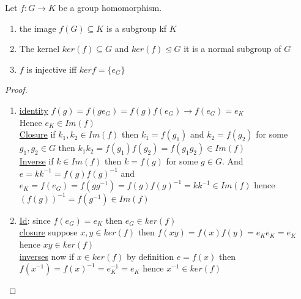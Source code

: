 \documentclass{article}
\begin{document}
\begin{proposition}[2.4.9]
    Let $f: G \rightarrow K$ be a group homomorphism. 
    \begin{enumerate}
        \item the image $f(G) \subseteq K$ is a subgroup kf $K$
        \item The kernel $ker(f) \subseteq G$ and $ker(f) \trianglelefteq G$ it is a normal subgroup of $G$ 
        \item $f$ is injective iff $ker f = \{e_G\}$
    \end{enumerate}
   
\end{proposition}
\begin{proof}\leavevmode \\ 
    \begin{enumerate} 
        \item \underline{identity} $f(g) = f(ge_G) = f(g) f(e_G) \rightarrow f(e_G) = e_K$ \\ Hence $e_K \in Im(f)$  
        \\  \underline{Closure} if $k_1, k_2 \in Im(f)$ then $k_1 = f(g_1)$ and $k_2 = f(g_2)$ for some $g_1, g_2 \in G$ then $k_1 k_2 = f(g_1) f(g_2) = f(g_1 g_2) \in Im(f)$
        \\ \underline{Inverse} if $k \in Im(f)$ then $k = f(g)$ for some $g \in G$. And $e = k k^{-1} = f(g) f(g)^{-1} $ and $e_K= f(e_G) = f(g g^{-1}) = f(g) f(g)^{-1} = k k^{-1} \in Im(f)$ hence $(f(g))^{-1} = f(g^{-1}) \in Im(f)$
        \item \underline{Id}: since $f(e_G) = e_K$ then $e_G \in ker(f)$ \\ 
        \underline{closure} suppose $x, y \in ker(f)$ then $f(xy) = f(x) f(y) = e_K e_K = e_K$ hence $xy \in ker(f)$ \\
        \underline{inverses} now if $x \in ker(f)$ by definition $e = f(x)$ then $f(x^{-1}) = f(x)^{-1} = e_K^{-1} = e_K$ hence $x^{-1} \in ker(f)$ \\
    \end{enumerate}
\end{proof}

 
\end{document}
